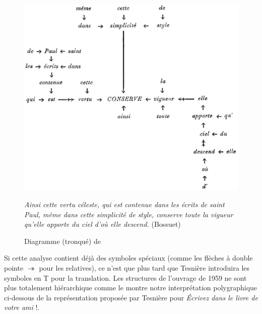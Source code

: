 {    \begin{figure}[H]
    \caption{Diagramme (tronqué) de \citet{tesniere1934comment}}
    \includegraphics[width=\textwidth]{figures/Tesniere1934.png}\smallskip\\    
    \noindent\parbox{\textwidth}{\small\textit{Ainsi cette vertu céleste, qui est contenue dans les écrits de saint Paul, même dans cette simplicité de style, conserve toute la vigueur qu’elle apporte du ciel d’où elle descend.} (Bossuet)}
    \end{figure}

    Si cette analyse contient déjà des symboles spéciaux (comme les flèches à double pointe \textrm{$\twoheadrightarrow $} pour les relatives), ce n’est que plus tard que Tesnière introduira les symboles en T pour la translation. Les structures de l’ouvrage de 1959 ne sont plus totalement hiérarchique comme le montre notre interprétation polygraphique ci-dessous de la représentation proposée par Tesnière pour \textit{Écrivez dans le livre de votre ami} !.

}
